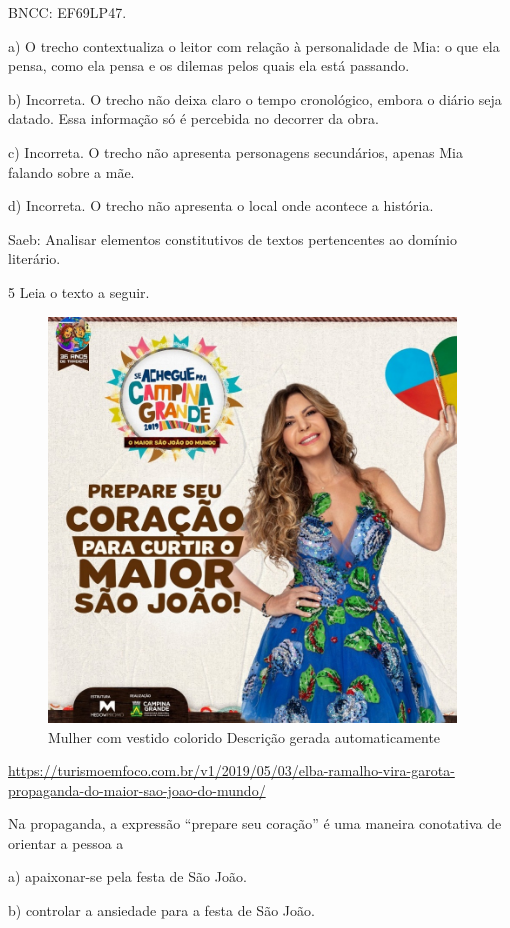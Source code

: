 BNCC: EF69LP47.

a) O trecho contextualiza o leitor com relação à personalidade de Mia: o
que ela pensa, como ela pensa e os dilemas pelos quais ela está
passando.

b) Incorreta. O trecho não deixa claro o tempo cronológico, embora o
diário seja datado. Essa informação só é percebida no decorrer da obra.

c) Incorreta. O trecho não apresenta personagens secundários, apenas Mia
falando sobre a mãe.

d) Incorreta. O trecho não apresenta o local onde acontece a história.

Saeb: Analisar elementos constitutivos de textos pertencentes ao domínio
literário.

\num{5} Leia o texto a seguir.

\begin{figure}
\centering
\includegraphics[width=4.26392in,height=4.23333in]{./imgSAEB_6_POR/media/image40.jpeg}
\caption{Mulher com vestido colorido Descrição gerada automaticamente}
\end{figure}

\url{https://turismoemfoco.com.br/v1/2019/05/03/elba-ramalho-vira-garota-propaganda-do-maior-sao-joao-do-mundo/}

Na propaganda, a expressão ``prepare seu coração'' é uma maneira
conotativa de orientar a pessoa a

a) apaixonar-se pela festa de São João.

b) controlar a ansiedade para a festa de São João.

